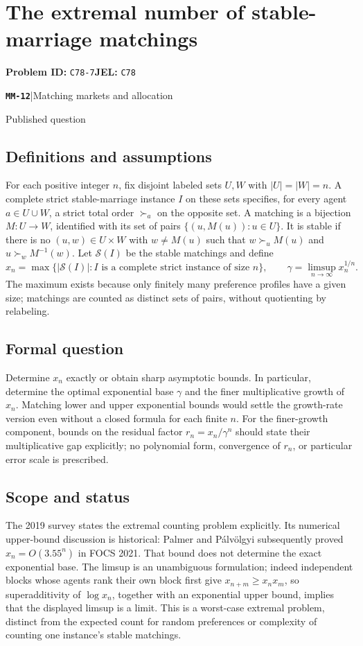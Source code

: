 \documentclass[11pt,a4paper]{article}
\newcommand{\entrymeta}[3]{{\sffamily\small\color{muted}\textbf{\texttt{#1}}\quad|\quad #2\par #3\par}}
\begin{document}
\section*{The extremal number of stable-marriage matchings}
\textbf{Problem ID:} \texttt{C78-7}\quad \textbf{JEL:} \texttt{C78}\par
\label{problem:OP-0553}
\label{beyond:MM-12}
\entrymeta{MM-12}{Matching markets and allocation}{Published question}
\subsection*{Definitions and assumptions}
For each positive integer $n$, fix disjoint labeled sets $U,W$ with $|U|=|W|=n$. A complete strict stable-marriage instance $I$ on these sets specifies, for every agent $a\in U\cup W$, a strict total order $\succ_a$ on the opposite set. A matching is a bijection $M:U\to W$, identified with its set of pairs $\{(u,M(u)):u\in U\}$. It is stable if there is no $(u,w)\in U\times W$ with $w\ne M(u)$ such that $w\succ_u M(u)$ and $u\succ_w M^{-1}(w)$. Let $\mathcal S(I)$ be the stable matchings and define
\[
 x_n=\max\{|\mathcal S(I)|:I\text{ is a complete strict instance of size }n\},
 \qquad \gamma=\limsup_{n\to\infty}x_n^{1/n}.
\]
The maximum exists because only finitely many preference profiles have a given size; matchings are counted as distinct sets of pairs, without quotienting by relabeling.
\subsection*{Formal question}
Determine $x_n$ exactly or obtain sharp asymptotic bounds. In particular, determine the optimal exponential base $\gamma$ and the finer multiplicative growth of $x_n$. Matching lower and upper exponential bounds would settle the growth-rate version even without a closed formula for each finite $n$. For the finer-growth component, bounds on the residual factor $r_n=x_n/\gamma^n$ should state their multiplicative gap explicitly; no polynomial form, convergence of $r_n$, or particular error scale is prescribed.
\subsection*{Scope and status}
The 2019 survey states the extremal counting problem explicitly. Its numerical upper-bound discussion is historical: Palmer and P\'alv\"olgyi subsequently proved $x_n=O(3.55^n)$ in FOCS 2021. That bound does not determine the exact exponential base. The limsup is an unambiguous formulation; indeed independent blocks whose agents rank their own block first give $x_{n+m}\ge x_nx_m$, so superadditivity of $\log x_n$, together with an exponential upper bound, implies that the displayed limsup is a limit. This is a worst-case extremal problem, distinct from the expected count for random preferences or complexity of counting one instance's stable matchings.
\end{document}
